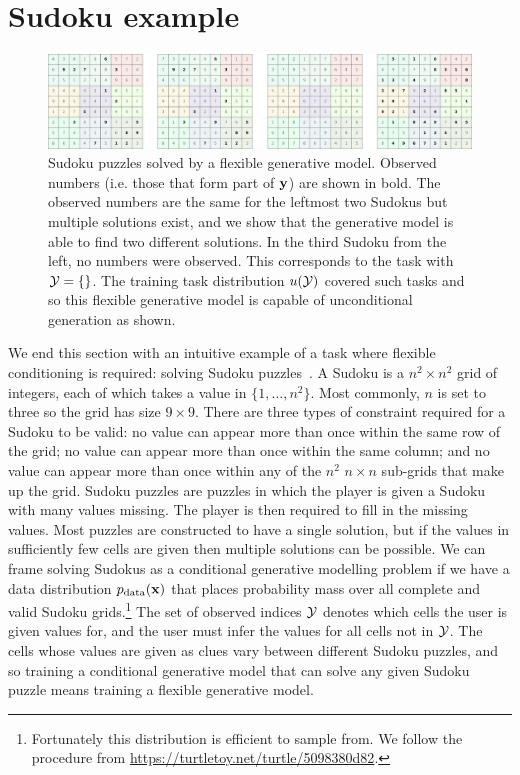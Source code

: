 \section{Sudoku example}
\begin{figure}[t]
    \centering
    \includegraphics[width=\textwidth]{figs/thesis/sudoku_panel.pdf}
    \caption{Sudoku puzzles solved by a flexible generative model. Observed numbers (i.e. those that form part of ${\mathbf{y}}$) are shown in bold. The observed numbers are the same for the leftmost two Sudokus but multiple solutions exist, and we show that the generative model is able to find two different solutions. In the third Sudoku from the left, no numbers were observed. This corresponds to the task with ${\mathcal{Y}} = \{\}$. The training task distribution $u({\mathcal{Y}})$ covered such tasks and so this flexible generative model is capable of unconditional generation as shown. }
    \label{fig:sudoku-panel}
\end{figure}
We end this section with an intuitive example of a task where flexible conditioning is required: solving Sudoku puzzles~\citep{weilbach2023graphically}. A Sudoku is a $n^2 \times n^2$ grid of integers, each of which takes a value in $\{1,\ldots,n^2\}$. Most commonly, $n$ is set to three so the grid has size $9 \times 9$. There are three types of constraint required for a Sudoku to be valid: no value can appear more than once within the same row of the grid; no value can appear more than once within the same column; and no value can appear more than once within any of the $n^2$ $n \times n$ sub-grids that make up the grid. Sudoku puzzles are puzzles in which the player is given a Sudoku with many values missing. The player is then required to fill in the missing values. Most puzzles are constructed to have a single solution, but if the values in sufficiently few cells are given then multiple solutions can be possible. We can frame solving Sudokus as a conditional generative modelling problem if we have a data distribution $p_{\rm{data}}({\mathbf{x}})$ that places probability mass over all complete and valid Sudoku grids.\footnote{Fortunately this distribution is efficient to sample from. We follow the procedure from \url{https://turtletoy.net/turtle/5098380d82}.} The set of observed indices ${\mathcal{Y}}$ denotes which cells the user is given values for, and the user must infer the values for all cells not in ${\mathcal{Y}}$. The cells whose values are given as clues vary between different Sudoku puzzles, and so training a conditional generative model that can solve any given Sudoku puzzle means training a flexible generative model. 

